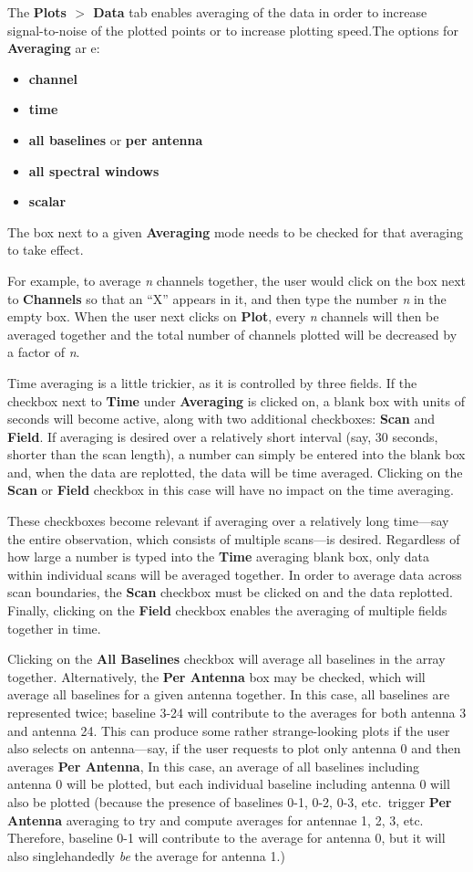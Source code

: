 The {\bf Plots $>$ Data} tab enables averaging of the data in order to increase signal-to-noise of the plotted points or to increase plotting speed.The options for {\bf Averaging} ar e: 
\begin{itemize}
   \item {\bf channel}
   \item {\bf time}
   \item {\bf all baselines} or {\bf per antenna}
   \item {\bf all spectral windows}
   \item {\bf scalar}
\end{itemize}
The box next to a given {\bf Averaging} mode needs to be checked for that averaging to take effect.

For example, to average {\it n} channels together, the user would click on the box next to {\bf Channels} so that an ``X'' appears in it, and then type the number {\it n} in the empty box. When the user next clicks on {\bf Plot}, every {\it n} channels will then be averaged together and the total number of channels plotted will be decreased by a factor of {\it n}.

Time averaging is a little trickier, as it is controlled by three fields. If the checkbox next to {\bf Time} under {\bf Averaging} is clicked on, a blank box with units of seconds will become active, along with two additional checkboxes: {\bf Scan} and {\bf Field}. If averaging is desired over a relatively short interval (say, 30 seconds, shorter than the scan length), a number can simply be entered into the blank box and, when the data are replotted, the data will be time averaged. Clicking on the {\bf Scan} or {\bf Field} checkbox in this case will have no impact on the time averaging.

These checkboxes become relevant if averaging over a relatively long time---say the entire observation, which consists of multiple scans---is desired. Regardless of how large a number is typed into the {\bf Time} averaging blank box, only data within individual scans will be averaged together. In order to average data across scan boundaries, the {\bf Scan} checkbox must be clicked on and the data replotted. Finally, clicking on the {\bf Field} checkbox enables the averaging of multiple fields together in time.

Clicking on the {\bf All Baselines} checkbox will average all baselines in the array together. Alternatively, the {\bf Per Antenna} box  may be checked, which will average all baselines for a given antenna together. In this case, all baselines are represented twice; baseline 3-24 will contribute to the averages for both antenna 3 and antenna 24. This can produce some rather strange-looking plots if the user also selects on antenna---say, if the user requests to plot only antenna 0 and then averages {\bf Per Antenna}, In this case, an average of all baselines including antenna 0 will be plotted, but each individual baseline including antenna 0 will also be plotted (because the presence of baselines 0-1, 0-2, 0-3, etc.~trigger {\bf Per Antenna} averaging to try and compute averages for antennae 1, 2, 3, etc. Therefore, baseline 0-1 will contribute to the average for antenna 0, but it will also singlehandedly {\it be} the average for antenna 1.) 

